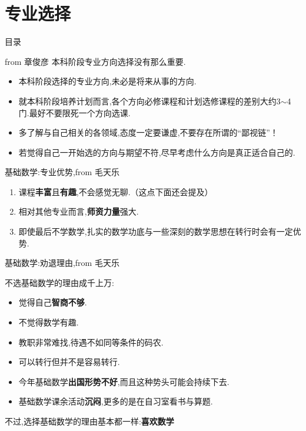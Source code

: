 \documentclass[pdf]{beamer}
\numberwithin{equation}{section}
\theoremstyle{plain}
\theoremstyle{plain}
\theoremstyle{plain}
\theoremstyle{remark}
\begin{document}
\section{专业选择}
\begin{frame}{目录}
\tableofcontents[currentsection]
\end{frame}
\begin{frame}{from 章俊彦}
\hspace*{20pt}本科阶段专业方向选择没有那么重要.
\begin{itemize}
	\item 本科阶段选择的专业方向,未必是将来从事的方向.
	\item 就本科阶段培养计划而言,各个方向必修课程和计划选修课程的差别大约3$\sim$4门.最好不要限死一个方向选课.
	\item 多了解与自己相关的各领域,态度一定要谦虚,不要存在所谓的“鄙视链”！
	\item 若觉得自己一开始选的方向与期望不符,尽早考虑什么方向是真正适合自己的.
\end{itemize}
\end{frame}
\begin{frame}{基础数学:专业优势,from 毛天乐}
\begin{enumerate}
	\item 课程\textbf{丰富}且\textbf{有趣},不会感觉无聊.（这点下面还会提及）
	\item 相对其他专业而言,\textbf{师资力量}强大.
	\item 即使最后不学数学,扎实的数学功底与一些深刻的数学思想在转行时会有一定优势.
\end{enumerate}
\end{frame}
\begin{frame}{基础数学:劝退理由,from 毛天乐}

	不选基础数学的理由成千上万:
	\begin{itemize}
		\item 觉得自己\textbf{智商不够}.
		\item 不觉得数学有趣.
		\item 教职非常难找,待遇不如同等条件的码农.
		\item 可以转行但并不是容易转行.
		\item 今年基础数学\textbf{出国形势不好},而且这种势头可能会持续下去.
		\item 基础数学课余活动\textbf{沉闷},更多的是在自习室看书与算题.
	\end{itemize}
	不过,选择基础数学的理由基本都一样:\textbf{{\LARGE 喜欢数学}}
\end{frame}
\end{document}
